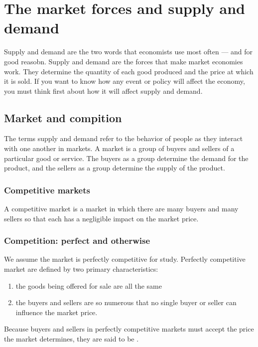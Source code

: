 
\chapter{The market forces and supply and demand}

Supply and demand are the two words that economists use most often --- and for good reasobn.
Supply and demand are the forces that make market economies work.
They determine the quantity of each good produced and the price at which it is sold.
If you want to know how any event or policy will affect the economy, you must think first about how it will affect supply and demand.


\section{Market and compition}

The terms supply and demand refer to the behavior of people as they interact with one another in markets.
A market is a group of buyers and sellers of a particular good or service.
The buyers as a group determine the demand for the product, and the sellers as a group determine the supply of the product.



\subsection{Competitive markets}

A competitive market is a market in which there are many buyers and many sellers so that each has a negligible impact on the market price.


\subsection{Competition: perfect and otherwise}

We assume the market is perfectly competitive for study.
Perfectly competitive market are defined by two primary characteristics:
\begin{enumerate}
\item the goods being offered for sale are all the same 
\item the buyers and sellers are so numerous that no single buyer or seller can influence the market price.
\end{enumerate}
Because buyers and sellers in perfectly competitive markets must accept the price the market determines, they are said to be .



